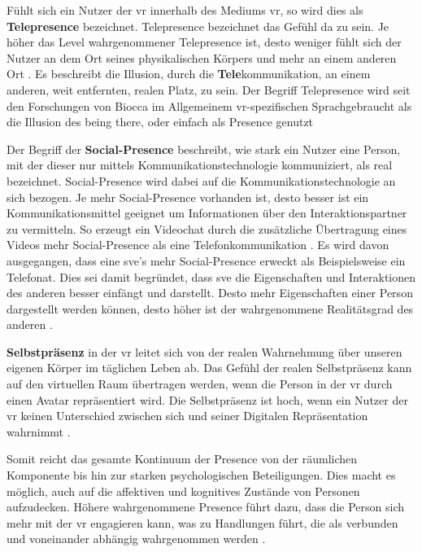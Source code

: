 \documentclass[a4paper,11pt]{article}%
\renewcommand{\\}{\vspace*{0.5\baselineskip} \newline}
\begin{document}
Fühlt sich ein Nutzer der \ac{vr} \dq{}innerhalb\dq{} des Mediums \ac{vr}, so wird dies als \textbf{Telepresence} bezeichnet. Telepresence bezeichnet das Gefühl \dq{}da zu sein\dq{}. Je höher das Level wahrgenommener Telepresence ist, desto weniger fühlt sich der Nutzer an dem Ort seines physikalischen Körpers und mehr an einem anderen Ort \citep[p.482]{nowak2004effect}. Es beschreibt die Illusion, durch die \textbf{Tele}kommunikation, an einem anderen, weit entfernten, realen Platz, zu sein. Der Begriff Telepresence wird seit den Forschungen von Biocca \cite[p.12]{biocca1999cyborg} im Allgemeinem \ac{vr}-spezifischen Sprachgebraucht als die Illusion des \dq{}being there\dq{}, oder einfach als \dq{}Presence\dq{} genutzt

Der Begriff der \dq{}\textbf{Social-Presence} \dq{} beschreibt, wie stark ein Nutzer eine Person, mit der dieser nur mittels Kommunikationstechnologie kommuniziert, als \dq{}real\dq{} bezeichnet. Social-Presence wird dabei auf die Kommunikationstechnologie an sich bezogen. Je mehr Social-Presence vorhanden ist, desto besser ist ein Kommunikationsmittel geeignet um Informationen über den Interaktionspartner zu vermitteln. So erzeugt ein Videochat durch die zusätzliche Übertragung eines Videos mehr Social-Presence als eine Telefonkommunikation \citep[p.151]{gunawardena1995social}.
Es wird davon ausgegangen, dass eine \ac{sve}'s mehr Social-Presence erweckt als Beispielsweise ein Telefonat. Dies sei damit begründet, dass \ac{sve} die Eigenschaften und Interaktionen des anderen besser einfängt und darstellt. Desto mehr Eigenschaften einer Person dargestellt werden können, desto höher ist der wahrgenommene Realitätsgrad des anderen \citep[p. 5-8]{biocca2002defining}.

\textbf{Selbstpräsenz} in der \ac{vr} leitet sich von der realen Wahrnehmung über unseren eigenen Körper im täglichen Leben ab. Das Gefühl der realen Selbstpräsenz kann auf den virtuellen Raum übertragen werden, wenn die Person in der \ac{vr} durch einen Avatar repräsentiert wird. Die Selbstpräsenz ist hoch, wenn ein Nutzer der \ac{vr} keinen Unterschied zwischen sich und seiner Digitalen Repräsentation wahrnimmt \citep[p.439]{schultze2010embodiment}.

Somit reicht das gesamte Kontinuum der \dq{}Presence\dq{} von der räumlichen Komponente bis hin zur starken psychologischen Beteiligungen. Dies macht es möglich, auch auf die affektiven und kognitives Zustände von Personen aufzudecken. Höhere wahrgenommene Presence führt dazu, dass die Person sich mehr mit der \ac{vr} engagieren kann, was zu Handlungen führt, die als verbunden und voneinander abhängig wahrgenommen werden \citep{biocca2001criteria}.
\end{document}
